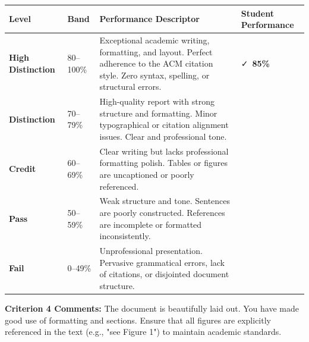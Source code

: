 \noindent
\begin{tabularx}{\textwidth}{@{} >{\bfseries}l p{1.8cm} X >{\centering\arraybackslash}p{1.6cm} @{}}
\toprule
Level & Band & Performance Descriptor & Student Performance \\
\midrule
High Distinction & 80--100\% & Exceptional academic writing, formatting, and layout. Perfect adherence to the ACM citation style. Zero syntax, spelling, or structural errors. & \cellcolor{success!10}\faCheck\ \textbf{85\%} \\
\midrule
Distinction & 70--79\% & High-quality report with strong structure and formatting. Minor typographical or citation alignment issues. Clear and professional tone. & \\
\midrule
Credit & 60--69\% & Clear writing but lacks professional formatting polish. Tables or figures are uncaptioned or poorly referenced. & \\
\midrule
Pass & 50--59\% & Weak structure and tone. Sentences are poorly constructed. References are incomplete or formatted inconsistently. & \\
\midrule
Fail & 0--49\% & Unprofessional presentation. Pervasive grammatical errors, lack of citations, or disjointed document structure. & \\
\bottomrule
\end{tabularx}

\vspace{0.8em}
\begin{tcolorbox}[colback=lightbg, colframe=bordercolor, arc=2pt, left=8pt, right=8pt, top=6pt, bottom=6pt]
\small \textbf{Criterion 4 Comments:} The document is beautifully laid out. You have made good use of formatting and sections. Ensure that all figures are explicitly referenced in the text (e.g., "see Figure 1") to maintain academic standards.
\end{tcolorbox}
